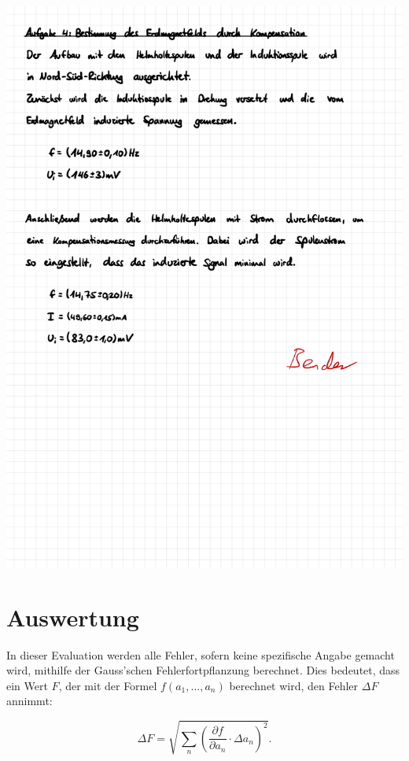 \documentclass{article}
\begin{document}
\includegraphics[width=\textwidth]{graphics/mess6.jpg}
\label{page:Schwebung}
\newpage

\addtocounter{table}{4}




\clearpage
\newpage
\section{Auswertung}

In dieser Evaluation werden alle Fehler, sofern keine spezifische Angabe gemacht wird, mithilfe der Gauss'schen Fehlerfortpflanzung berechnet. Dies bedeutet, dass ein Wert $F$, der mit der Formel $f(a_1, ..., a_n)$ berechnet wird, den Fehler $\Delta F$ annimmt:

\begin{equation}
    \Delta F = \sqrt{\sum_n \left( \frac{\partial f}{\partial a_n} \cdot \Delta a_n \right)^2}.
\end{equation}
\end{document}
